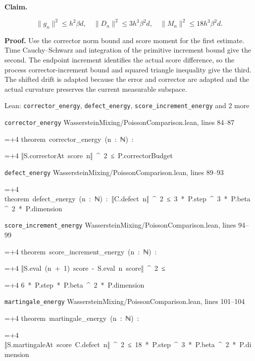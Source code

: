 \documentclass[11pt,a4paper]{report}
\newlength{\leancharwidth}
\newenvironment{leancode}{\par\smallskip\begingroup\ttfamily\footnotesize\raggedright
  \settowidth{\leancharwidth}{M}\setlength{\parskip}{0pt}\setlength{\parindent}{0pt}
  \frenchspacing}{\par\endgroup\smallskip}
\newcommand{\leanline}[2]{\hangindent=\dimexpr#1\leancharwidth+4\leancharwidth\relax
  \hangafter=1\noindent\hspace*{#1\leancharwidth}#2\par}
\newcommand{\leansource}[1]{\par{\footnotesize\color{leanmuted}#1}\par}
\begin{document}
\textbf{Claim.}

\[\|g_n\|^2\le h^2\beta d,\quad\|D_n\|^2\le3h^3\beta^2d,\quad\|M_n\|^2\le18h^3\beta^2d.\]

\textbf{Proof.} Use the corrector norm bound and score moment for the first estimate. Time Cauchy–Schwarz and integration of the primitive increment bound give the second. The endpoint increment identifies the actual score difference, so the process corrector-increment bound and squared triangle inequality give the third. The shifted drift is adapted because the error and corrector are adapted and the actual curvature preserves the current measurable subspace.

\begin{leanbox}{Lean: \texttt{corrector\_\allowbreak{}energy}, \texttt{defect\_\allowbreak{}energy}, \texttt{score\_\allowbreak{}increment\_\allowbreak{}energy} and 2 more}
\leansource{\texttt{corrector\_\allowbreak{}energy} \quad WassersteinMixing/\allowbreak{}PoissonComparison.lean, lines 84–87}
\begin{leancode}
\leanline{0}{theorem\ corrector\_energy\ (n\ :\ ℕ)\ :}
\leanline{4}{‖S.correctorAt\ score\ n‖\ \textasciicircum{}\ 2\ ≤\ P.correctorBudget}
\end{leancode}
\leansource{\texttt{defect\_\allowbreak{}energy} \quad WassersteinMixing/\allowbreak{}PoissonComparison.lean, lines 89–93}
\begin{leancode}
\leanline{0}{theorem\ defect\_energy\ (n\ :\ ℕ)\ :\ ‖C.defect\ n‖\ \textasciicircum{}\ 2\ ≤\ 3\ *\ P.step\ \textasciicircum{}\ 3\ *\ P.beta\ \textasciicircum{}\ 2\ *\ P.dimension}
\end{leancode}
\leansource{\texttt{score\_\allowbreak{}increment\_\allowbreak{}energy} \quad WassersteinMixing/\allowbreak{}PoissonComparison.lean, lines 94–99}
\begin{leancode}
\leanline{0}{theorem\ score\_increment\_energy\ (n\ :\ ℕ)\ :}
\leanline{4}{‖S.eval\ (n\ +\ 1)\ score\ -\ S.eval\ n\ score‖\ \textasciicircum{}\ 2\ ≤}
\leanline{6}{6\ *\ P.step\ *\ P.beta\ \textasciicircum{}\ 2\ *\ P.dimension}
\end{leancode}
\leansource{\texttt{martingale\_\allowbreak{}energy} \quad WassersteinMixing/\allowbreak{}PoissonComparison.lean, lines 101–104}
\begin{leancode}
\leanline{0}{theorem\ martingale\_energy\ (n\ :\ ℕ)\ :}
\leanline{4}{‖S.martingaleAt\ score\ C.defect\ n‖\ \textasciicircum{}\ 2\ ≤\ 18\ *\ P.step\ \textasciicircum{}\ 3\ *\ P.beta\ \textasciicircum{}\ 2\ *\ P.dimension}
\end{leancode}

\end{leanbox}
\end{document}

